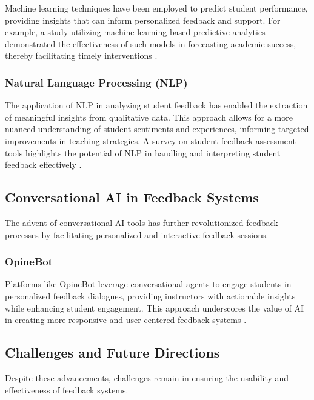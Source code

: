 \documentclass[conference]{IEEEtran}
\begin{document}
Machine learning techniques have been employed to predict student performance, providing insights that can inform personalized feedback and support. For example, a study utilizing machine learning-based predictive analytics demonstrated the effectiveness of such models in forecasting academic success, thereby facilitating timely interventions \cite{8725237}.

\subsubsection{Natural Language Processing (NLP)}

The application of NLP in analyzing student feedback has enabled the extraction of meaningful insights from qualitative data. This approach allows for a more nuanced understanding of student sentiments and experiences, informing targeted improvements in teaching strategies. A survey on student feedback assessment tools highlights the potential of NLP in handling and interpreting student feedback effectively \cite{edalati2020potentialmachinelearningnlp}.

\subsection{Conversational AI in Feedback Systems}

The advent of conversational AI tools has further revolutionized feedback processes by facilitating personalized and interactive feedback sessions.

\subsubsection{OpineBot}

Platforms like OpineBot leverage conversational agents to engage students in personalized feedback dialogues, providing instructors with actionable insights while enhancing student engagement. This approach underscores the value of AI in creating more responsive and user-centered feedback systems \cite{tanwar2024opinebotclassfeedbackreimagined}.

\subsection{Challenges and Future Directions}

Despite these advancements, challenges remain in ensuring the usability and effectiveness of feedback systems.
\end{document}
